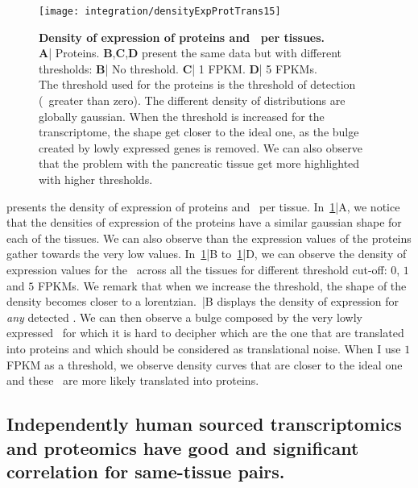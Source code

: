 \begin{figure}[!htbp]
    \texttt{[image: integration/densityExpProtTrans15]}\centering
    \caption[Density of expression of proteins and \mRNAs\ per
    tissues.]
    {\label{fig:densityExpProtTrans15}\textbf{Density of expression of
    proteins and \mRNAs\ per tissues.} \\\textbf{A}| Proteins.
    \textbf{B},\textbf{C},\textbf{D} present the same data but with
    different thresholds:
    \textbf{B}| No threshold. \textbf{C}| 1 \gls{FPKM}.
    \textbf{D}| 5 \glspl{FPKM}.\\The threshold used for the proteins is the
    threshold of
    detection (\ie\ greater than zero). The different density of distributions are
    globally gaussian. When the threshold is increased for the transcriptome, the
    shape get closer to the ideal one, as the bulge created by lowly expressed
    genes is removed. We can also observe that the problem with the pancreatic
    tissue get more highlighted with higher thresholds.}
\end{figure}

 presents the density of expression
of proteins and \mRNAs\ per tissue. In~\cref{fig:densityExpProtTrans15}|A,
we notice that the densities of expression of the proteins have a similar gaussian
shape for each of the tissues. We can also observe than the expression values
of the proteins gather towards the very low values.
In~\cref{fig:densityExpProtTrans15}|B to~\cref{fig:densityExpProtTrans15}|D,
we can observe the density of expression values for
the \mRNAs\ across all the tissues for
different threshold cut-off: $0$, $1$ and $5$ \glspl{FPKM}.
We remark that when we increase the threshold, the shape
of the density becomes closer to a lorentzian.~|B
displays the density of expression for \emph{any} detected \mRNA\@. We can
then observe a bulge composed by the very lowly expressed \mRNAs\, for which it
is hard to decipher which are the one that are translated into proteins and which
should be considered as translational noise. When I use $1$ \gls{FPKM} as a threshold,
we observe density curves that are closer to the ideal one and these \mRNAs\ are
more likely translated into proteins.


\subsection{Independently human sourced transcriptomics and proteomics
have good and significant correlation for same-tissue pairs.}
\label{subsec:IntegrationGoodCorrProtTrans}

